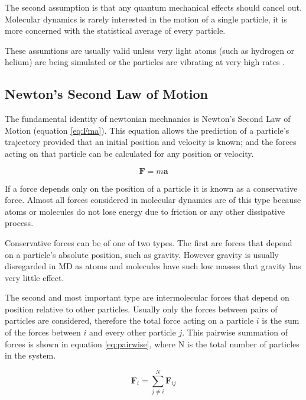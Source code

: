 \documentclass[12pt]{UoAthesis}
\begin{document}
The second assumption is that any quantum mechanical effects should
cancel out. Molecular dynamics is rarely interested in the motion of a
single particle, it is more concerned with the statistical average of
every particle.

These assumtions are usually valid unless very light atoms (such as
hydrogen or helium) are being simulated or the particles are vibrating
at very high rates \cite{Frenkel2002}.

\subsection{Newton's Second Law of Motion \label{NewtonLaw}}

The fundamental identity of newtonian mechnanics is Newton's Second
Law of Motion (equation \eqref{eq:Fma}). This equation allows the prediction of a
particle's trajectory provided that an initial position and velocity
is known; and the forces acting on that particle can be calculated for
any position or velocity.

\begin{equation}
  \mathbf{F} = m\mathbf{a}
  \label{eq:Fma} 
\end{equation}

If a force depends only on the position of a particle it is known as a
conservative force. Almost all forces considered in molecular dynamics
are of this type because atoms or molecules do not lose energy due to
friction or any other dissipative process.

Conservative forces can be of one of two types.  The first are forces
that depend on a particle's absolute position, such as gravity.
However gravity is usually disregarded in MD as atoms and molecules
have such low masses that gravity has very little effect.

The second and most important type are intermolecular forces that
depend on position relative to other particles.  Usually only the
forces between pairs of particles are considered, therefore the total
force acting on a particle $i$ is the sum of the forces between $i$
and every other particle $j$.  This pairwise summation of forces is
shown in equation \eqref{eq:pairwise}, where N is the total number of
particles in the system.

\begin{equation} 
  \mathbf{F}_i = \sum_{j \not= i}^{N}\mathbf{F}_{ij}
  \label{eq:pairwise}
\end{equation}
\end{document}
